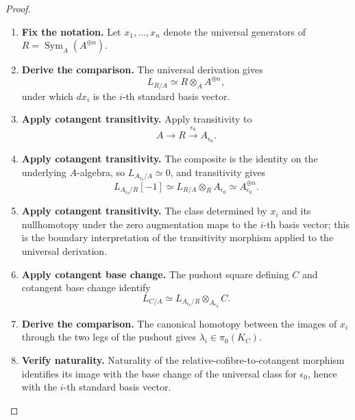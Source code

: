 \begin{proof}
\leavevmode
\begin{enumerate}[label=\textup{(\arabic*)}]
    \item \textbf{Fix the notation.}
    Let \(x_1,\ldots,x_n\) denote the universal generators of \(R=\operatorname{Sym}_A(A^{\oplus n})\).

    \item \textbf{Derive the comparison.}
    The universal derivation gives
    \[
        L_{R/A}\simeq R\otimes_AA^{\oplus n},
    \]
    under which \(dx_i\) is the \(i\)-th standard basis vector.

    \item \textbf{Apply cotangent transitivity.}
    Apply transitivity to
    \[
        A\longrightarrow R\xrightarrow{\epsilon_0}A_{\epsilon_0}.
    \]

    \item \textbf{Apply cotangent transitivity.}
    The composite is the identity on the underlying \(A\)-algebra, so \(L_{A_{\epsilon_0}/A}\simeq0\), and
    transitivity gives
    \[
        L_{A_{\epsilon_0}/R}[-1]
        \simeq
        L_{R/A}\otimes_RA_{\epsilon_0}
        \simeq
        A_{\epsilon_0}^{\oplus n}.
    \]

    \item \textbf{Apply cotangent transitivity.}
    The class determined by \(x_i\) and its nullhomotopy under the zero augmentation maps to
    the \(i\)-th basis vector; this is the boundary interpretation of the transitivity
    morphism applied to the universal derivation.

    \item \textbf{Apply cotangent base change.}
    The pushout square defining \(C\) and cotangent base change identify
    \[
        L_{C/A}
        \simeq
        L_{A_{\epsilon_0}/R}\otimes_{A_{\epsilon_0}}C.
    \]

    \item \textbf{Derive the comparison.}
    The canonical homotopy between the images of \(x_i\) through the two legs of the pushout
    gives \(\lambda_i\in\pi_0(K_C)\).

    \item \textbf{Verify naturality.}
    Naturality of the relative-cofibre-to-cotangent morphism identifies its image with the base
    change of the universal class for \(\epsilon_0\), hence with the \(i\)-th standard basis
    vector.
\end{enumerate}
\end{proof}

